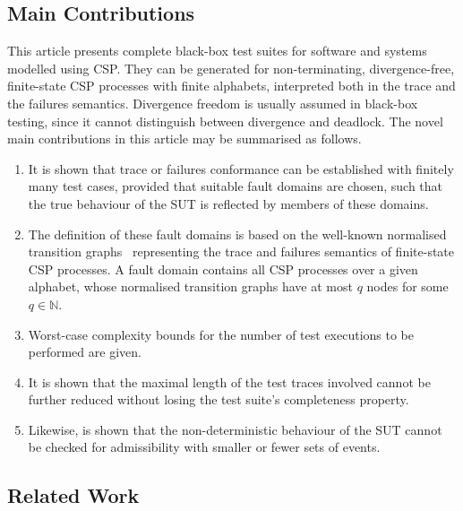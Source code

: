 
\subsection{Main Contributions}

This article presents   complete black-box test suites for software and systems
modelled using CSP. They can be generated for non-terminating,
divergence-free, finite-state CSP processes with finite alphabets,
interpreted both in the trace and the failures semantics. Divergence freedom
is usually assumed in black-box testing, since it cannot distinguish between
divergence and deadlock.
%
The  novel main contributions in this article may be summarised as follows.
\begin{enumerate}
\item It is shown that trace or failures conformance can be established with finitely many test cases, provided that suitable fault domains are chosen, such that the true behaviour of the SUT is reflected by members of these domains.

\item The definition of these fault domains is based on the well-known normalised transition graphs~\cite{Roscoe:1994:chapter} representing the  trace and failures semantics of finite-state CSP processes. A fault domain contains all CSP processes over a given alphabet, whose normalised transition graphs have at most $q$ nodes for some $q\in\mathbb{N}$. 

\item Worst-case complexity bounds for the number of test executions to be performed are given.

\item It is shown that the maximal length of the test traces involved cannot be further reduced without losing the test suite's completeness property.

\item Likewise, is shown that the non-deterministic behaviour of the SUT cannot be 
checked for admissibility with smaller or fewer sets of events.
\end{enumerate}




\subsection{Related Work}


